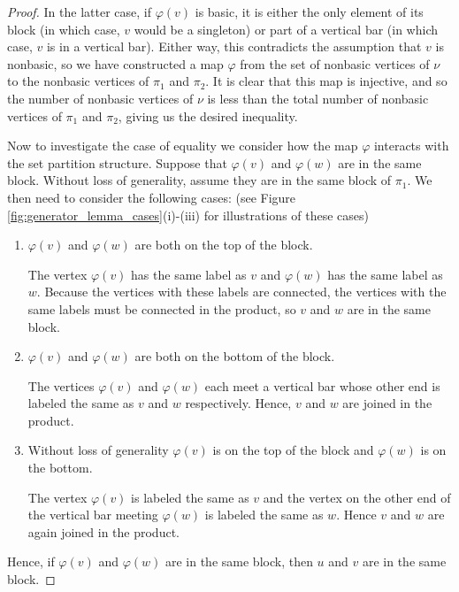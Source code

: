 \begin{proof}
    In the latter case, if $\varphi(v)$ is basic, it is either the only element of its block (in which case, $v$ would be a singleton) or part of a vertical bar (in which case, $v$ is in a vertical bar). Either way, this contradicts the assumption that $v$ is nonbasic, so we have constructed a map $\varphi$ from the set of nonbasic vertices of $\nu$ to the nonbasic vertices of $\pi_1$ and $\pi_2$. It is clear that this map is injective, and so the number of nonbasic vertices of $\nu$ is less than the total number of nonbasic vertices of 
    $\pi_1$ and $\pi_2$, giving us the desired inequality.

    Now to investigate the case of equality we consider how the map $\varphi$ interacts with the set partition structure. Suppose that $\varphi(v)$ and $\varphi(w)$ are in the same block. Without loss of generality, assume they are in the same block of $\pi_1$. We then need to consider the following cases: (see Figure \ref{fig:generator_lemma_cases}(i)-(iii) for illustrations of these cases)

    \begin{enumerate}
        \item[(i)] $\varphi(v)$ and $\varphi(w)$ are both on the top of the block.

        The vertex $\varphi(v)$ has the same label as $v$ and $\varphi(w)$ has the same label as $w$. Because the vertices with these labels are connected, the vertices with the same labels must be connected in the product, so $v$ and $w$ are in the same block.

        \item[(ii)] $\varphi(v)$ and $\varphi(w)$ are both on the bottom of the block.

        The vertices $\varphi(v)$ and $\varphi(w)$ each meet a vertical bar whose other end is labeled the same as $v$ and $w$ respectively. Hence, $v$ and $w$ are joined in the product.

        \item[(iii)] Without loss of generality $\varphi(v)$ is on the top of the block and $\varphi(w)$ is on the bottom.

        The vertex $\varphi(v)$ is labeled the same as $v$ and the vertex on the other end of the vertical bar meeting $\varphi(w)$ is labeled the same as $w$. Hence $v$ and $w$ are again joined in the product.
    \end{enumerate}

    Hence, if $\varphi(v)$ and $\varphi(w)$ are in the same block, then $u$ and $v$ are in the same block.


\end{proof}
